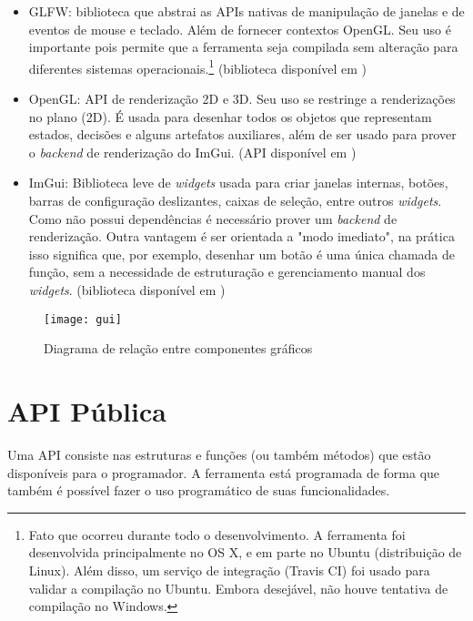 \begin{itemize}
  \item GLFW: biblioteca que abstrai as APIs nativas de manipulação de janelas e
    de eventos de mouse e teclado.  Além de fornecer contextos OpenGL.  Seu uso
    é importante pois permite que a ferramenta seja compilada sem alteração para
    diferentes sistemas operacionais.\footnote{Fato que ocorreu durante todo o
      desenvolvimento.  A ferramenta foi desenvolvida principalmente no OS X, e
      em parte no Ubuntu (distribuição de Linux).  Além disso, um serviço de
      integração (Travis CI) foi usado para validar a compilação no Ubuntu.
    Embora desejável, não houve tentativa de compilação no Windows.} (biblioteca
    disponível em \cite{glfwdocs})
  \item OpenGL: API de renderização 2D e 3D.  Seu uso se restringe a
    renderizações no plano (2D).  É usada para desenhar todos os objetos que
    representam estados, decisões e alguns artefatos auxiliares, além de ser
    usado para prover o \textit{backend} de renderização do ImGui. (API
    disponível em \cite{opengldocs})
  \item ImGui: Biblioteca leve de \textit{widgets} usada para criar janelas
    internas, botões, barras de configuração deslizantes, caixas de seleção,
    entre outros \textit{widgets}.  Como não possui dependências é necessário
    prover um \textit{backend} de renderização.  Outra vantagem é ser orientada
    a "modo imediato", na prática isso significa que, por exemplo, desenhar um
    botão é uma única chamada de função, sem a necessidade de estruturação e
    gerenciamento manual dos \textit{widgets}. (biblioteca disponível em
    \cite{imguigithub})
\end{itemize}

\begin{figure}[H]
  \centering
  \texttt{[image: gui]}
  \caption{Diagrama de relação entre componentes gráficos}\label{fig:arch_gui}
\end{figure}


\section{API Pública}


Uma API consiste nas estruturas e funções (ou também métodos) que estão
disponíveis para o programador.  A ferramenta está programada de forma que
também é possível fazer o uso programático de suas funcionalidades.

